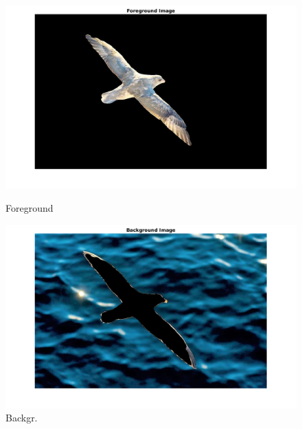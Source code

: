 \documentclass[12pt, a4paper]{article}
\begin{document}
\begin{figure}[h!]
\begin{minipage}[c][1\width]{0.3\textwidth}
    	\includegraphics[width=1.5\textwidth]{bird_foreground.png}
    	\null\vspace*{-28pt}
    	\caption{Foreground}
	    \label{fig:3.2(c)}
    \end{minipage}
    \renewcommand{\thefigure}{3.2(d)}
    \begin{minipage}[c][1\width]{0.3\textwidth}
    	\includegraphics[width=1.5\textwidth]{bird_background.png}
    	\null\vspace*{-28pt}
    	\caption{Backgr.}
	    \label{fig:3.2(d)}
    \end{minipage}
\end{figure}
\newpage
\end{document}
